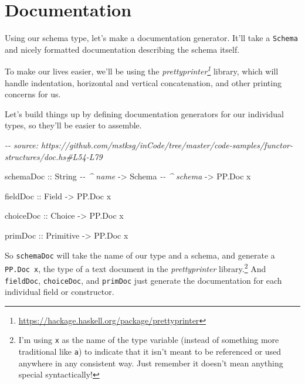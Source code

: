 \documentclass[]{article}
\newenvironment{Shaded}{}{}
\newcommand{\CommentTok}[1]{\textcolor[rgb]{0.38,0.63,0.69}{\textit{#1}}}
\newcommand{\DataTypeTok}[1]{\textcolor[rgb]{0.56,0.13,0.00}{#1}}
\newcommand{\NormalTok}[1]{#1}
\newcommand{\OtherTok}[1]{\textcolor[rgb]{0.00,0.44,0.13}{#1}}
\renewcommand{\href}[2]{#2\footnote{\url{#1}}}
\begin{document}
\hypertarget{documentation}{%
\section{Documentation}\label{documentation}}

Using our schema type, let's make a documentation generator. It'll take a
\texttt{Schema} and nicely formatted documentation describing the schema itself.

To make our lives easier, we'll be using the
\emph{\href{https://hackage.haskell.org/package/prettyprinter}{prettyprinter}}
library, which will handle indentation, horizontal and vertical concatenation,
and other printing concerns for us.

Let's build things up by defining documentation generators for our individual
types, so they'll be easier to assemble.

\begin{Shaded}
\begin{Highlighting}[]
\CommentTok{{-}{-} source: https://github.com/mstksg/inCode/tree/master/code{-}samples/functor{-}structures/doc.hs\#L54{-}L79}

\NormalTok{schemaDoc}
\OtherTok{    ::} \DataTypeTok{String}       \CommentTok{{-}{-} \^{} name}
    \OtherTok{{-}>} \DataTypeTok{Schema}       \CommentTok{{-}{-} \^{} schema}
    \OtherTok{{-}>} \DataTypeTok{PP.Doc}\NormalTok{ x}

\OtherTok{fieldDoc ::} \DataTypeTok{Field} \OtherTok{{-}>} \DataTypeTok{PP.Doc}\NormalTok{ x}

\OtherTok{choiceDoc ::} \DataTypeTok{Choice} \OtherTok{{-}>} \DataTypeTok{PP.Doc}\NormalTok{ x}

\OtherTok{primDoc ::} \DataTypeTok{Primitive} \OtherTok{{-}>} \DataTypeTok{PP.Doc}\NormalTok{ x}
\end{Highlighting}
\end{Shaded}

So \texttt{schemaDoc} will take the name of our type and a schema, and generate
a \texttt{PP.Doc\ x}, the type of a text document in the \emph{prettyprinter}
library.\footnote{I'm using \texttt{x} as the name of the type variable (instead
  of something more traditional like \texttt{a}) to indicate that it isn't meant
  to be referenced or used anywhere in any consistent way. Just remember it
  doesn't mean anything special syntactically!} And \texttt{fieldDoc},
\texttt{choiceDoc}, and \texttt{primDoc} just generate the documentation for
each individual field or constructor.
\end{document}
